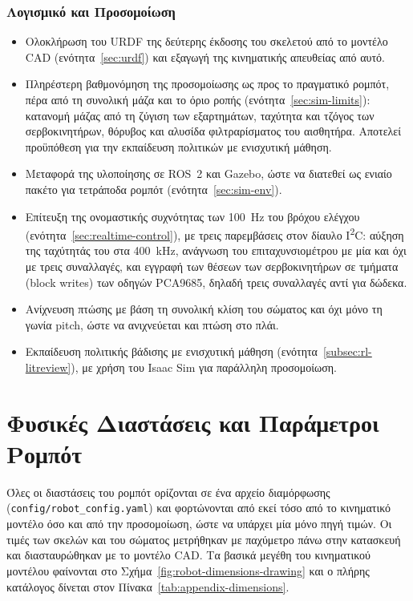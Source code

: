 \documentclass[11pt]{report}
\begin{document}
\subsection{Λογισμικό και Προσομοίωση}
\begin{itemize}
  \item Ολοκλήρωση του URDF της δεύτερης έκδοσης του σκελετού από το μοντέλο
  CAD (ενότητα~\ref{sec:urdf}) και εξαγωγή της κινηματικής απευθείας από αυτό.
  \item Πληρέστερη βαθμονόμηση της προσομοίωσης ως προς το πραγματικό ρομπότ,
  πέρα από τη συνολική μάζα και το όριο ροπής (ενότητα~\ref{sec:sim-limits}):
  κατανομή μάζας από τη ζύγιση των εξαρτημάτων, ταχύτητα και τζόγος των
  σερβοκινητήρων, θόρυβος και αλυσίδα φιλτραρίσματος του αισθητήρα. Αποτελεί
  προϋπόθεση για την εκπαίδευση πολιτικών με ενισχυτική μάθηση.
  \item Μεταφορά της υλοποίησης σε ROS~2 και Gazebo, ώστε να διατεθεί ως ενιαίο
  πακέτο για τετράποδα ρομπότ (ενότητα~\ref{sec:sim-env}).
  \item Επίτευξη της ονομαστικής συχνότητας των 100~Hz του βρόχου ελέγχου
  (ενότητα~\ref{sec:realtime-control}), με τρεις παρεμβάσεις στον δίαυλο
  I\textsuperscript{2}C: αύξηση της ταχύτητάς του στα 400~kHz, ανάγνωση του
  επιταχυνσιομέτρου με μία και όχι με τρεις συναλλαγές, και εγγραφή των θέσεων
  των σερβοκινητήρων σε τμήματα (block writes) των οδηγών PCA9685, δηλαδή τρεις
  συναλλαγές αντί για δώδεκα.
  \item Ανίχνευση πτώσης με βάση τη συνολική κλίση του σώματος και όχι μόνο τη
  γωνία pitch, ώστε να ανιχνεύεται και πτώση στο πλάι.
  \item Εκπαίδευση πολιτικής βάδισης με ενισχυτική μάθηση
  (ενότητα~\ref{subsec:rl-litreview}), με χρήση του Isaac Sim για παράλληλη
  προσομοίωση.
\end{itemize}

\appendix
{}

\chapter{Φυσικές Διαστάσεις και Παράμετροι Ρομπότ}
\label{app:dimensions}
Όλες οι διαστάσεις του ρομπότ ορίζονται σε ένα αρχείο διαμόρφωσης
(\texttt{config/robot\_config.yaml}) και φορτώνονται από εκεί τόσο από το
κινηματικό μοντέλο όσο και από την προσομοίωση, ώστε να υπάρχει μία μόνο πηγή
τιμών. Οι τιμές των σκελών και του σώματος μετρήθηκαν με παχύμετρο πάνω στην
κατασκευή και διασταυρώθηκαν με το μοντέλο CAD. Τα βασικά μεγέθη του
κινηματικού μοντέλου φαίνονται στο Σχήμα~\ref{fig:robot-dimensions-drawing} και
ο πλήρης κατάλογος δίνεται στον Πίνακα~\ref{tab:appendix-dimensions}.
\end{document}

